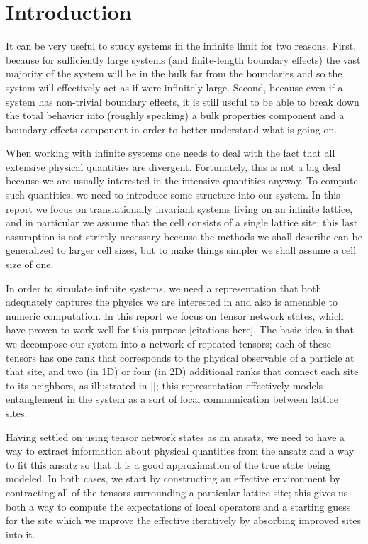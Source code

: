 \documentclass{article}
\begin{document}
\part*{Introduction}

It can be very useful to study systems in the infinite limit for two reasons.  First, because for sufficiently large systems (and finite-length boundary effects) the vast majority of the system will be in the bulk far from the boundaries and so the system will effectively act as if were infinitely large.  Second, because even if a system has non-trivial boundary effects, it is still useful to be able to break down the total behavior into (roughly speaking) a bulk properties component and a boundary effects component in order to better understand what is going on.

When working with infinite systems one needs to deal with the fact that all extensive physical quantities are divergent.  Fortunately, this is not a big deal because we are usually interested in the intensive quantities anyway.  To compute such quantities, we need to introduce some structure into our system.  In this report we focus on translationally invariant systems living on an infinite lattice, and in particular we assume that the cell consists of a single lattice site;  this last assumption is not strictly necessary because the methods we shall describe can be generalized to larger cell sizes, but to make things simpler we shall assume a cell size of one.

In order to simulate infinite systems, we need a representation that both adequately captures the physics we are interested in and also is amenable to numeric computation.  In this report we focus on tensor network states, which have proven to work well for this purpose [citations here].  The basic idea is that we decompose our system into a network of repeated tensors; each of these tensors has one rank that corresponds to the physical observable of a particle at that site, and two (in 1D) or four (in 2D) additional ranks that connect each site to its neighbors, as illustrated in [];  this representation effectively models entanglement in the system as a sort of local communication between lattice sites.

Having settled on using tensor network states as an ansatz, we need to have a way to extract information about physical quantities from the ansatz and a way to fit this ansatz so that it is a good approximation of the true state being modeled.  In both cases, we start by constructing an effective environment by contracting all of the tensors surrounding a particular lattice site; this gives us both a way to compute the expectations of local operators and a starting guess for the site which we improve the effective iteratively by absorbing improved sites into it.
\end{document}
